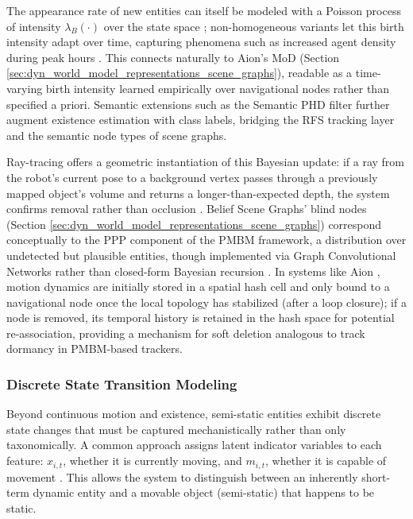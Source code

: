 The appearance rate of new entities can itself be modeled with a Poisson process of intensity $\lambda_B(\cdot)$ over the state space \cite{garcia2018poisson}; non-homogeneous variants let this birth intensity adapt over time, capturing phenomena such as increased agent density during peak hours \cite{li2023adaptive}. 
This connects naturally to Aion's MoD (Section \ref{sec:dyn_world_model_representations_scene_graphs}), readable as a time-varying birth intensity learned empirically over navigational nodes rather than specified a priori. 
Semantic extensions such as the Semantic PHD filter \cite{chen2019multi} further augment existence estimation with class labels, bridging the RFS tracking layer and the semantic node types of scene graphs.

Ray-tracing offers a geometric instantiation of this Bayesian update: if a ray from the robot's current pose to a background vertex passes through a previously mapped object's volume and returns a longer-than-expected depth, the system confirms removal rather than occlusion \cite{schmid_khronos_2024}. 
Belief Scene Graphs' blind nodes (Section \ref{sec:dyn_world_model_representations_scene_graphs}) correspond conceptually to the PPP component of the PMBM framework, a distribution over undetected but plausible entities, though implemented via Graph Convolutional Networks rather than closed-form Bayesian recursion \cite{saucedo_estimating_2025}. 
In systems like Aion \cite{catalano_aion_2025}, motion dynamics are initially stored in a spatial hash cell and only bound to a navigational node once the local topology has stabilized (after a loop closure); if a node is removed, its temporal history is retained in the hash space for potential re-association, providing a mechanism for soft deletion analogous to track dormancy in PMBM-based trackers.

\subsubsection{Discrete State Transition Modeling}
Beyond continuous motion and existence, semi-static entities exhibit discrete state changes that must be captured mechanistically rather than only taxonomically. 
A common approach assigns latent indicator variables to each feature: $\mathit{x}_{i,t}$, whether it is currently moving, and $\mathit{m}_{i,t}$, whether it is capable of movement \cite{brink_using_2016}. 
This allows the system to distinguish between an inherently short-term dynamic entity and a movable object (semi-static) that happens to be static.

